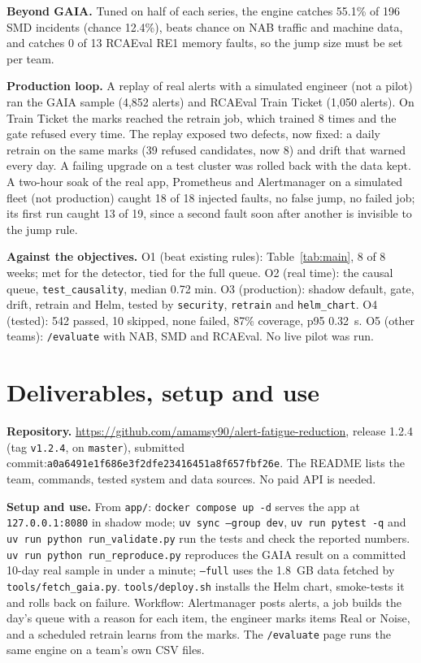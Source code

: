 \documentclass[12pt,a4paper]{article}
\begin{document}
\textbf{Beyond GAIA.} Tuned on half of each series, the engine catches 55.1\% of 196 SMD incidents (chance 12.4\%), beats chance on NAB traffic and machine data, and catches 0 of 13 RCAEval RE1 memory faults, so the jump size must be set per team.

\textbf{Production loop.} A replay of real alerts with a simulated engineer (not a pilot) ran the GAIA sample (4{,}852 alerts) and RCAEval Train Ticket (1{,}050 alerts). On Train Ticket the marks reached the retrain job, which trained 8 times and the gate refused every time. The replay exposed two defects, now fixed: a daily retrain on the same marks (39 refused candidates, now 8) and drift that warned every day. A failing upgrade on a test cluster was rolled back with the data kept. A two-hour soak of the real app, Prometheus and Alertmanager on a simulated fleet (not production) caught 18 of 18 injected faults, no false jump, no failed job; its first run caught 13 of 19, since a second fault soon after another is invisible to the jump rule.

\textbf{Against the objectives.} O1 (beat existing rules): Table~\ref{tab:main}, 8 of 8 weeks; met for the detector, tied for the full queue. O2 (real time): the causal queue, \texttt{test\_causality}, median 0.72 min. O3 (production): shadow default, gate, drift, retrain and Helm, tested by \texttt{security}, \texttt{retrain} and \texttt{helm\_chart}. O4 (tested): 542 passed, 10 skipped, none failed, 87\% coverage, p95 0.32~s. O5 (other teams): \texttt{/evaluate} with NAB, SMD and RCAEval. No live pilot was run.



\section{Deliverables, setup and use}
\textbf{Repository.} \url{https://github.com/amamsy90/alert-fatigue-reduction}, release 1.2.4 (tag \texttt{v1.2.4}, on \texttt{master}), submitted commit:\newline \mbox{\texttt{a0a6491e1f686e3f2dfe23416451a8f657fbf26e}}. The README lists the team, commands, tested system and data sources. No paid API is needed.

\textbf{Setup and use.} From \texttt{app/}: \texttt{docker compose up -d} serves the app at \texttt{127.0.0.1:8080} in shadow mode; \texttt{uv sync --group dev}, \texttt{uv run pytest -q} and \texttt{uv run python run\_validate.py} run the tests and check the reported numbers. \texttt{uv run python run\_reproduce.py} reproduces the GAIA result on a committed 10-day real sample in under a minute; \texttt{--full} uses the 1.8~GB data fetched by \texttt{tools/fetch\_gaia.py}. \texttt{tools/deploy.sh} installs the Helm chart, smoke-tests it and rolls back on failure. Workflow: Alertmanager posts alerts, a job builds the day's queue with a reason for each item, the engineer marks items Real or Noise, and a scheduled retrain learns from the marks. The \texttt{/evaluate} page runs the same engine on a team's own CSV files.
\end{document}
